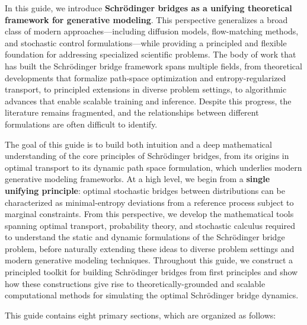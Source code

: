 \documentclass{article}
\begin{document}
In this guide, we introduce \textbf{Schrödinger bridges as a unifying theoretical framework for generative modeling}. This perspective generalizes a broad class of modern approaches—including diffusion models, flow-matching methods, and stochastic control formulations—while providing a principled and flexible foundation for addressing specialized scientific problems. The body of work that has built the Schrödinger bridge framework spans multiple fields, from theoretical developments that formalize path-space optimization and entropy-regularized transport, to principled extensions in diverse problem settings, to algorithmic advances that enable scalable training and inference. Despite this progress, the literature remains fragmented, and the relationships between different formulations are often difficult to identify.

The goal of this guide is to build both intuition and a deep mathematical understanding of the core principles of Schrödinger bridges, from its origins in optimal transport to its dynamic path space formulation, which underlies modern generative modeling frameworks. At a high level, we begin from a \textbf{single unifying principle}: optimal stochastic bridges between distributions can be characterized as minimal-entropy deviations from a reference process subject to marginal constraints. From this perspective, we develop the mathematical tools spanning optimal transport, probability theory, and stochastic calculus required to understand the static and dynamic formulations of the Schrödinger bridge problem, before naturally extending these ideas to diverse problem settings and modern generative modeling techniques. Throughout this guide, we construct a principled toolkit for building Schrödinger bridges from first principles and show how these constructions give rise to theoretically-grounded and scalable computational methods for simulating the optimal Schrödinger bridge dynamics.

This guide contains eight primary sections, which are organized as follows:
\end{document}
